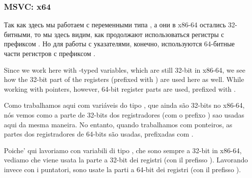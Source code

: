\subsubsection{MSVC: x64}


\ifdefined\RUSSIAN
Так как здесь мы работаем с переменными типа \Tint, а они в x86-64 остались 32-битными, то мы здесь видим, как продолжают использоваться регистры с префиксом .
Но для работы с указателями, конечно, используются 64-битные части регистров с префиксом .


\fi

\ifdefined\ENGLISH
Since we work here with \Tint{}-typed variables, which are still 32-bit in x86-64, we see how the 32-bit part of the registers (prefixed with ) are used here as well.
While working with pointers, however, 64-bit register parts are used, prefixed with .


\fi

\ifdefined\BRAZILIAN
Como trabalhamos aqui com variáveis do tipo \Tint, que ainda são 32-bits no x86-64, nós vemos como a parte de 32-bits dos registradores (com o prefixo ) sao usadas aqui da mesma maneira.
No entanto, quando trabalhamos com ponteiros, as partes dos registradores de 64-bits são usadas, prefixadas com .


\fi

\ifdefined\ITALIAN
Poiche' qui lavoriamo con variabili di tipo \Tint{}, che sono sempre a 32-bit in x86-64, vediamo che viene usata la parte a 32-bit dei registri (con il prefisso ).
Lavorando invece con i puntatori, sono usate la parti a 64-bit dei registri (con il prefisso ).


\fi
